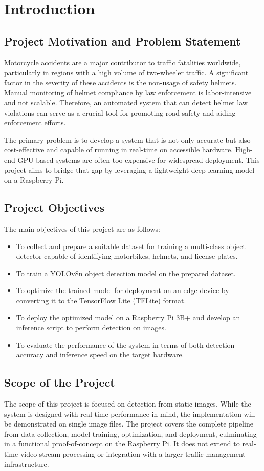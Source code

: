 \chapter{Introduction}
\section{Project Motivation and Problem Statement}
Motorcycle accidents are a major contributor to traffic fatalities worldwide, particularly in regions with a high volume of two-wheeler traffic. A significant factor in the severity of these accidents is the non-usage of safety helmets. Manual monitoring of helmet compliance by law enforcement is labor-intensive and not scalable. Therefore, an automated system that can detect helmet law violations can serve as a crucial tool for promoting road safety and aiding enforcement efforts.

The primary problem is to develop a system that is not only accurate but also cost-effective and capable of running in real-time on accessible hardware. High-end GPU-based systems are often too expensive for widespread deployment. This project aims to bridge that gap by leveraging a lightweight deep learning model on a Raspberry Pi.

\section{Project Objectives}
The main objectives of this project are as follows:
\begin{itemize}
    \item To collect and prepare a suitable dataset for training a multi-class object detector capable of identifying motorbikes, helmets, and license plates.
    \item To train a YOLOv8n object detection model on the prepared dataset.
    \item To optimize the trained model for deployment on an edge device by converting it to the TensorFlow Lite (TFLite) format.
    \item To deploy the optimized model on a Raspberry Pi 3B+ and develop an inference script to perform detection on images.
    \item To evaluate the performance of the system in terms of both detection accuracy and inference speed on the target hardware.
\end{itemize}

\section{Scope of the Project}
The scope of this project is focused on detection from static images. While the system is designed with real-time performance in mind, the implementation will be demonstrated on single image files. The project covers the complete pipeline from data collection, model training, optimization, and deployment, culminating in a functional proof-of-concept on the Raspberry Pi. It does not extend to real-time video stream processing or integration with a larger traffic management infrastructure.

